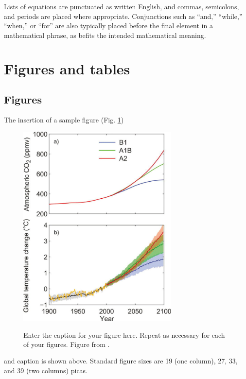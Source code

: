 \documentclass[12pt]{article}
\begin{document}
Lists of equations are punctuated as written English, and commas, semicolons, and periods are placed where appropriate. Conjunctions such as ``and,'' ``while,'' ``when,'' or ``for'' are also typically placed before the final element in a mathematical phrase, as befits the intended mathematical meaning.   

\section{Figures and tables}

\subsection{Figures}
The insertion of a sample figure (Fig. \ref{f1}) 
\begin{figure}[t]
  \noindent\includegraphics[width=19pc,angle=0]{figure01.pdf}\\
  \caption{Enter the caption for your figure here.  Repeat as
  necessary for each of your figures. Figure from \protect\cite{Knutti2008}.}\label{f1}
\end{figure}
and caption is shown above. Standard figure sizes are 19 (one column), 27, 33, and 39 (two columns) picas.
\end{document}
